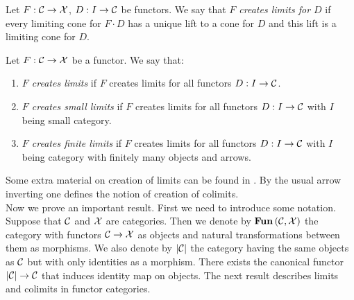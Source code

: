 \begin{definition}
Let $F:{\mathcal C}\rightarrow {\mathcal X}$, $D:I\rightarrow {\mathcal C}$ be functors. We say that \textit{$F$ creates limits for $D$} if every limiting cone for $F\cdot D$ has a unique lift to a cone for $D$ and this lift is a limiting cone for $D$.
\end{definition}

\begin{definition}
Let $F:{\mathcal C}\rightarrow {\mathcal X}$ be a functor. We say that:
\begin{enumerate}[label=\textbf{(\arabic*)}, leftmargin=1.5em]
\item \textit{$F$ creates limits} if $F$ creates limits for all functors $D:I\rightarrow {\mathcal C}$.
\item \textit{$F$ creates small limits} if $F$ creates limits for all functors $D:I\rightarrow {\mathcal C}$ with $I$ being small category.
\item \textit{$F$ creates finite limits} if $F$ creates limits for all functors $D:I\rightarrow {\mathcal C}$ with $I$ being category with finitely many objects and arrows.
\end{enumerate}
\end{definition}
\noindent
Some extra material on creation of limits can be found in {\cite[V.1]{Maclane}}. By the usual arrow inverting one defines the notion of creation of colimits.\\
Now we prove an important result. First we need to introduce some notation. Suppose that ${\mathcal C}$ and ${\mathcal X}$ are categories. Then we denote by $\mathbf{Fun}\left({\mathcal C},{\mathcal X}\right)$ the category with functors ${\mathcal C}\rightarrow {\mathcal X}$ as objects and natural transformations between them as morphisms. We also denote by $|{\mathcal C}|$ the category having the same objects as ${\mathcal C}$ but with only identities as a morphism. There exists the canonical functor $|{\mathcal C}|\rightarrow {\mathcal C}$ that induces identity map on objects. The next result describes limits and colimits in functor categories.

